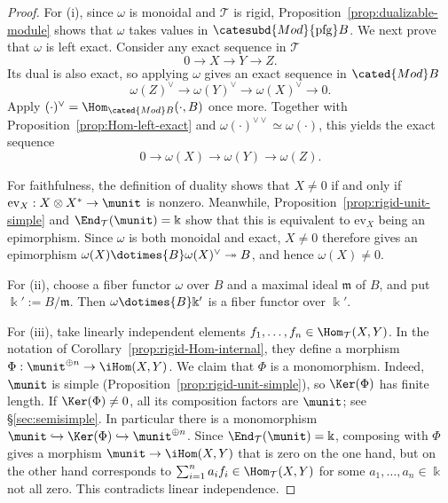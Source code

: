 \begin{proof}
	For (i), since $\omega$ is monoidal and $\mathcal{T}$ is rigid,
	Proposition~\ref{prop:dualizable-module} shows that $\omega$ takes values
	in $\catesubd{Mod}{\mathrm{pfg}}B$. We next prove that $\omega$ is left
	exact. Consider any exact sequence in $\mathcal{T}$
	\[ 0 \to X \to Y \to Z. \]
	Its dual is also exact, so applying $\omega$ gives an exact sequence in
	$\cated{Mod}B$
	\[ \omega(Z)^\vee \to \omega(Y)^\vee \to \omega(X)^\vee \to 0. \]
	Apply
	$(\mathord\cdot)^\vee=\Hom_{\cated{Mod}B}(\mathord\cdot,B)$ once more.
	Together with Proposition~\ref{prop:Hom-left-exact} and
	$\omega(\mathord\cdot)^{\vee\vee}\simeq\omega(\mathord\cdot)$, this
	yields the exact sequence
	\[ 0 \to \omega(X) \to \omega(Y) \to \omega(Z). \]

	For faithfulness, the definition of duality shows that $X\neq0$ if and
	only if $\mathrm{ev}_X:X\otimes X^*\to\munit$ is nonzero. Meanwhile,
	Proposition~\ref{prop:rigid-unit-simple} and
	$\End_{\mathcal{T}}(\munit)=\Bbbk$ show that this is equivalent to
	$\mathrm{ev}_X$ being an epimorphism. Since $\omega$ is both monoidal and
	exact, $X\neq0$ therefore gives an epimorphism
	$\omega(X)\dotimes{B}\omega(X)^\vee\twoheadrightarrow B$, and hence
	$\omega(X)\neq0$.

	For (ii), choose a fiber functor $\omega$ over $B$ and a maximal ideal
	$\mathfrak m$ of $B$, and put $\Bbbk':=B/\mathfrak m$. Then
	$\omega\dotimes{B}\Bbbk'$ is a fiber functor over $\Bbbk'$.

	For (iii), take linearly independent elements
	$f_1,\ldots,f_n\in\Hom_{\mathcal{T}}(X,Y)$. In the notation of
	Corollary~\ref{prop:rigid-Hom-internal}, they define a morphism
	$\Phi:\munit^{\oplus n}\to\iHom(X,Y)$. We claim that $\Phi$ is a
	monomorphism. Indeed, $\munit$ is simple
	(Proposition~\ref{prop:rigid-unit-simple}), so $\Ker(\Phi)$ has finite
	length. If $\Ker(\Phi)\neq0$, all its composition factors are $\munit$;
	see \S\ref{sec:semisimple}. In particular there is a monomorphism
	$\munit\hookrightarrow\Ker(\Phi)\hookrightarrow\munit^{\oplus n}$.
	Since $\End_{\mathcal{T}}(\munit)=\Bbbk$, composing with $\Phi$ gives a
	morphism $\munit\to\iHom(X,Y)$ that is zero on the one hand, but on the
	other hand corresponds to
	$\sum_{i=1}^na_if_i\in\Hom_{\mathcal{T}}(X,Y)$ for some
	$a_1,\ldots,a_n\in\Bbbk$ not all zero. This contradicts linear
	independence.


\end{proof}
